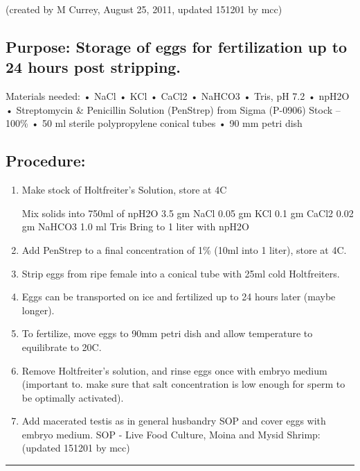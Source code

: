 \documentclass[
]{book}
\begin{document}
(created by M Currey, August 25, 2011, updated 151201 by mcc)

\hypertarget{purpose-storage-of-eggs-for-fertilization-up-to-24-hours-post-stripping.}{%
\subsection{Purpose: Storage of eggs for fertilization up to 24 hours post stripping.}\label{purpose-storage-of-eggs-for-fertilization-up-to-24-hours-post-stripping.}}

Materials needed:
• NaCl
• KCl
• CaCl2
• NaHCO3
• Tris, pH 7.2
• npH2O
• Streptomycin \& Penicillin Solution (PenStrep) from Sigma (P-0906) Stock -- 100\%
• 50 ml sterile polypropylene conical tubes
• 90 mm petri dish

\hypertarget{procedure-2}{%
\subsection{Procedure:}\label{procedure-2}}

\begin{enumerate}
\def\labelenumi{\arabic{enumi}.}
\item
  Make stock of Holtfreiter's Solution, store at 4C

  Mix solids into 750ml of npH2O
  3.5 gm NaCl
  0.05 gm KCl
  0.1 gm CaCl2
  0.02 gm NaHCO3
  1.0 ml Tris
  Bring to 1 liter with npH2O
\item
  Add PenStrep to a final concentration of 1\% (10ml into 1 liter), store at 4C.
\item
  Strip eggs from ripe female into a conical tube with 25ml cold Holtfreiters.
\item
  Eggs can be transported on ice and fertilized up to 24 hours later (maybe longer).
\item
  To fertilize, move eggs to 90mm petri dish and allow temperature to equilibrate to 20C.
\item
  Remove Holtfreiter's solution, and rinse eggs once with embryo medium (important to.
  make sure that salt concentration is low enough for sperm to be optimally activated).
\item
  Add macerated testis as in general husbandry SOP and cover eggs with embryo medium.
  SOP - Live Food Culture, Moina and Mysid Shrimp:
  (updated 151201 by mcc)
\end{enumerate}

\begin{center}\rule{0.5\linewidth}{0.5pt}\end{center}
\end{document}
